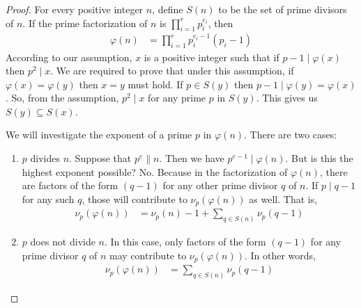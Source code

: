 \documentclass[main.tex]{subfile}
\begin{document}
		\begin{proof}
			For every positive integer $n$, define $S(n)$ to be the set of prime divisors of $n$. If the prime factorization of $n$ is $\prod_{i=1}^{r}p_i^{e_i}$, then
				\begin{align*}
					\varphi(n) & = \prod_{i=1}^{r}p_i^{e_i-1}(p_i-1)
				\end{align*}
			According to our assumption, $x$ is a positive integer such that if $p-1\mid \varphi(x)$ then $p^2\mid x$. We are required to prove that under this assumption, if $\varphi(x)=\varphi(y)$ then $x=y$ must hold. If $p\in S(y)$ then $p-1\mid \varphi(y)=\varphi(x)$. So, from the assumption, $p^2\mid x$ for any prime $p$ in $S(y)$. This gives us $S(y)\subseteq S(x)$.

			We will investigate the exponent of a prime $p$ in $\varphi(n)$. There are two cases:
				\begin{enumerate}
					\item $p$ divides $n$. Suppose that $p^e\|n$. Then we have $p^{e-1}\mid \varphi(n)$. But is this the highest exponent possible? No. Because in the factorization of $\varphi(n)$, there are factors of the form $(q-1)$ for any other prime divisor $q$ of $n$. If $p\mid q-1$ for any such $q$, those will contribute to $\nu_{p}(\varphi(n))$ as well. That is,
						\begin{align*}
							\nu_{p}(\varphi(n)) & = \nu_{p}(n)-1+\sum_{q\in S(n)}\nu_{p}(q-1)
						\end{align*}

					\item $p$ does not divide $n$. In this case, only factors of the form $(q-1)$ for any prime divisor $q$ of $n$ may contribute to $\nu_{p}(\varphi(n))$. In other words,
						\begin{align*}
							\nu_{p}(\varphi(n)) & = \sum_{q\in S(n)}\nu_{p}(q-1)
						\end{align*}
				\end{enumerate}


\end{proof}
\end{document}
